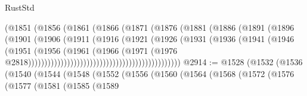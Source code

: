 \begin{lexlean}{RustStd}
\begin{coremodule}
                                              (@1851
                                                (@1856
                                                  (@1861
                                                    (@1866
                                                      (@1871
                                                        (@1876
                                                          (@1881
                                                            (@1886
                                                              (@1891
                                                                (@1896
                                                                  (@1901
                                                                    (@1906
                                                                      (@1911
                                                                        (@1916
                                                                          (@1921
                                                                            (@1926
                                                                              (@1931
                                                                                (@1936
                                                                                  (@1941
                                                                                    (@1946
                                                                                      (@1951
                                                                                        (@1956
                                                                                          (@1961
                                                                                            (@1966
                                                                                              (@1971
                                                                                                (@1976
                                                                                                  @2818)))))))))))))))))))))))))))))))))))))))))))))))
@2914 := @1528
    (@1532
      (@1536
        (@1540
          (@1544
            (@1548
              (@1552
                (@1556
                  (@1560
                    (@1564
                      (@1568
                        (@1572
                          (@1576
                            (@1577
                              (@1581
                                (@1585
                                  (@1589

\end{coremodule}
\end{lexlean}
